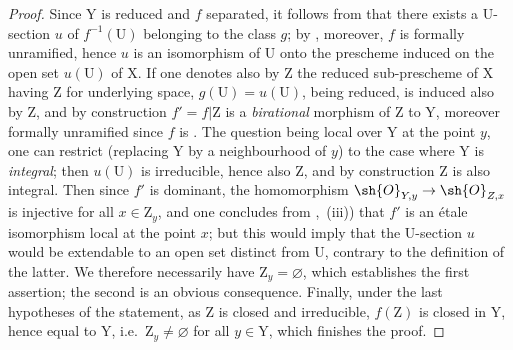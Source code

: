 \begin{proof}
Since $\mathrm{Y}$ is reduced and $f$ separated, it follows from  that there exists a $\mathrm{U}$-section $u$ of $f^{-1}(\mathrm{U})$ belonging to the class $g$; by , moreover, $f$ is formally unramified, hence $u$ is an isomorphism of $\mathrm{U}$ onto the prescheme induced on the open set $u(\mathrm{U})$ of $\mathrm{X}$.
If one denotes also by $\mathrm{Z}$ the reduced sub-prescheme of $\mathrm{X}$ having $\mathrm{Z}$ for underlying space, $g(\mathrm{U})=u(\mathrm{U})$, being reduced, is induced also by $\mathrm{Z}$, and by construction $f'=f|\mathrm{Z}$ is a \emph{birational} morphism of $\mathrm{Z}$ to $\mathrm{Y}$, moreover formally unramified since $f$ is .
The question being local over $\mathrm{Y}$ at the point $y$, one can restrict (replacing $\mathrm{Y}$ by a neighbourhood of $y$) to the case where $\mathrm{Y}$ is \emph{integral}; then $u(\mathrm{U})$ is irreducible, hence also $\mathrm{Z}$, and by construction $\mathrm{Z}$ is also integral.
Then  since $f'$ is dominant, the homomorphism $\sh{O}_{Y,y}\to\sh{O}_{Z,x}$ is injective for all $x\in\mathrm{Z}_y$, and one concludes from ,~(iii)) that $f'$ is an \'etale isomorphism local at the point $x$; but this would imply that the $\mathrm{U}$-section $u$ would be extendable to an open set distinct from $\mathrm{U}$, contrary to the definition of the latter.
We therefore necessarily have $\mathrm{Z}_y=\varnothing$, which establishes the first assertion; the second is an obvious consequence.
Finally, under the last hypotheses of the statement, as $\mathrm{Z}$ is closed and irreducible, $f(\mathrm{Z})$ is closed in $\mathrm{Y}$, hence equal to $\mathrm{Y}$, i.e.\ $\mathrm{Z}_y\neq\varnothing$ for all $y\in\mathrm{Y}$, which finishes the proof.
\end{proof}

